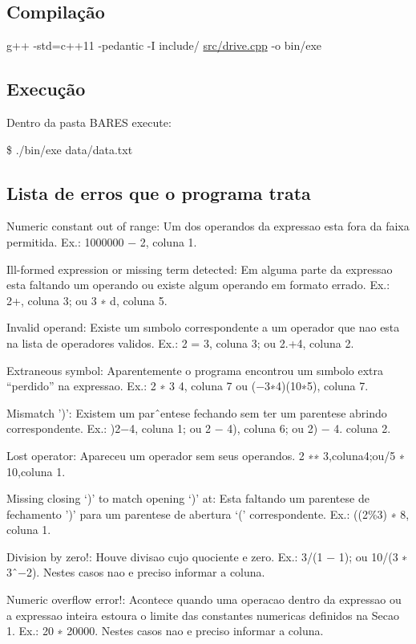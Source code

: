 \subsection*{Compilação}

g++ -\/std=c++11 -\/pedantic -\/I include/ \hyperlink{drive_8cpp}{src/drive.\+cpp} -\/o bin/exe

\subsection*{Execução}

Dentro da pasta B\+A\+R\+ES execute\+:

\$ ./bin/exe data/data.\+txt

\subsection*{Lista de erros que o programa trata}


\begin{DoxyEnumerate}
\item Numeric constant out of range\+: Um dos operandos da expressao esta fora da faixa permitida. Ex.\+: 1000000 − 2, coluna 1.
\item Ill-\/formed expression or missing term detected\+: Em alguma parte da expressao esta faltando um operando ou existe algum operando em formato errado. Ex.\+: 2+, coluna 3; ou 3 ∗ d, coluna 5.
\item Invalid operand\+: Existe um sımbolo correspondente a um operador que nao esta na lista de operadores validos. Ex.\+: 2 = 3, coluna 3; ou 2.+4, coluna 2.
\item Extraneous symbol\+: Aparentemente o programa encontrou um sımbolo extra “perdido” na expressao. Ex.\+: 2 ∗ 3 4, coluna 7 ou (−3∗4)(10∗5), coluna 7.
\item Mismatch ’)’\+: Existem um parˆentese fechando sem ter um parentese abrindo correspondente. Ex.\+: )2−4, coluna 1; ou 2 − 4), coluna 6; ou 2) − 4. coluna 2.
\item Lost operator\+: Apareceu um operador sem seus operandos. 2 ∗∗ 3,coluna4;ou/5 ∗ 10,coluna 1.
\item Missing closing ‘)’ to match opening ‘)’ at\+: Esta faltando um parentese de fechamento ’)’ para um parentese de abertura ‘(’ correspondente. Ex.\+: ((2\%3) ∗ 8, coluna 1.
\item Division by zero!\+: Houve divisao cujo quociente e zero. Ex.\+: 3/(1 − 1); ou 10/(3 ∗ 3ˆ−2). Nestes casos nao e preciso informar a coluna.
\item Numeric overflow error!\+: Acontece quando uma operacao dentro da expressao ou a expressao inteira estoura o limite das constantes numericas definidos na Secao 1. Ex.\+: 20 ∗ 20000. Nestes casos nao e preciso informar a coluna.
\end{DoxyEnumerate}

